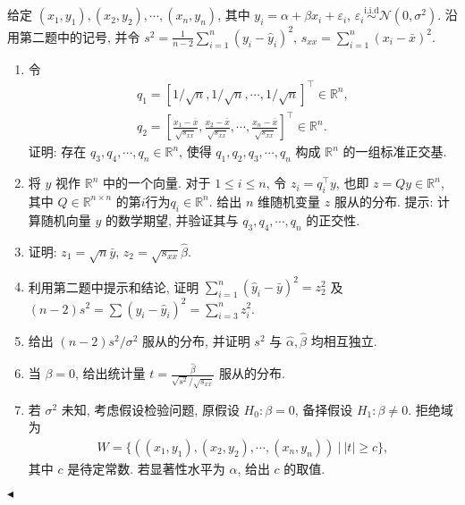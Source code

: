 \documentclass[11pt]{article}
\newenvironment{problem}[2][Problem]{\begin{trivlist}
    \item[\hskip \labelsep {\bfseries #1}\hskip \labelsep {\bfseries #2.}]\songti}{\hfill$\blacktriangleleft$\end{trivlist}}
\newcommand\1{\mathds{1}}
\newcommand\R{\mathbb{R}}
\newcommand{\iid}{\overset{\text{i.i.d}}{\sim}}
\begin{document}
\begin{problem}{3}
    给定 $(x_1,y_1), (x_2,y_2), \cdots, (x_n,y_n)$, 其中 $y_i = \alpha + \beta x_i + \varepsilon_i$, $\varepsilon_i \iid \mathcal{N}(0,\sigma^2)$. 
    沿用第二题中的记号, 并令 $s^2 = \frac{1}{n-2}\sum_{i=1}^n (y_i - \hat{y}_i)^2$, $s_{xx} = \sum_{i=1}^n (x_i - \bar{x})^2$. 
    \begin{enumerate}[label = (\arabic*)]
        \item 令
        \begin{gather*}
            q_1 = \left[1/\sqrt{n}, 1/\sqrt{n}, \cdots, 1/\sqrt{n} \right]^{\top} \in \R^n, \\
            q_2 = \left[\frac{x_1 - \bar{x}}{\sqrt{s_{xx}}}, \frac{x_2 - \bar{x}}{\sqrt{s_{xx}}}, \cdots,\frac{x_n - \bar{x}}{\sqrt{s_{xx}}}\right]^{\top} \in \R^n.
        \end{gather*}
        证明: 存在 $q_3, q_4, \cdots, q_n \in \R^n$, 使得 $q_1, q_2, q_3, \cdots, q_n$ 构成 $\R^n$ 的一组标准正交基.
        \item 将 $y$ 视作 $\R^n$ 中的一个向量. 对于 $1 \le i \le n$, 令 $z_i = q_i^{\top} y$, 也即 $z = Qy \in \R^n$, 
        其中 $Q \in \R^{n\times n}$ 的第$i$行为$q_i \in \R^n$. 给出 $n$ 维随机变量 $z$ 服从的分布. 
        {\kaishu 提示: 计算随机向量 $y$ 的数学期望, 并验证其与 $q_3, q_4, \cdots, q_n$ 的正交性.}
        \item 证明: $z_1 = \sqrt{n}\bar{y}$, $z_2 = \sqrt{s_{xx}}\hat{\beta}$. 
        \item 利用第二题中提示和结论, 证明 $\sum_{i=1}^{n} (\hat{y}_i - \bar{y})^2 = z_2^2 $ 及 $(n-2)s^2 = \sum (y_i - \hat{y}_i)^2 = \sum_{i=3}^{n} z_i^2$.
        \item 给出 $(n-2)s^2/\sigma^2$ 服从的分布, 并证明 $s^2$ 与 $\hat{\alpha}, \hat{\beta}$ 均相互独立.
        \item 当 $\beta = 0$, 给出统计量 $t = \frac{\hat{\beta}}{\sqrt{s^2}/\sqrt{s_{xx}}}$ 服从的分布.
        \item 若 $\sigma^2$ 未知, 考虑假设检验问题, 原假设 $H_0: \beta = 0$, 备择假设 $H_1: \beta \neq 0$. 拒绝域为
        \begin{align*}
            W = \{((x_1, y_1), (x_2, y_2), \cdots, (x_n, y_n)) ~|~ |t|\ge c\},
        \end{align*}
        其中 $c$ 是待定常数. 若显著性水平为 $\alpha$, 给出 $c$ 的取值.
    \end{enumerate}
\end{problem}
\end{document}
